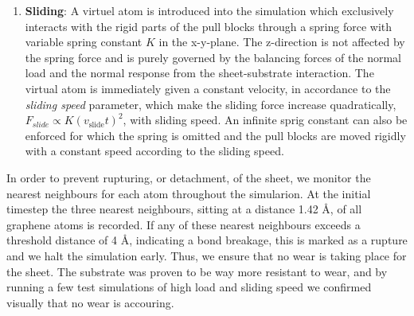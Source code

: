 \begin{enumerate}
  \item \textbf{Sliding}: A virtuel atom is introduced into the simulation which
  exclusively interacts with the rigid parts of the pull blocks through a spring force
  with variable spring constant $K$ in the x-y-plane. The z-direction is not
  affected by the spring force and is purely governed by the balancing forces of the normal load and the normal response from the sheet-substrate interaction. The
  virtual atom is immediately given a constant velocity, in accordance to
  the \textit{sliding speed} parameter, which make the sliding force increase quadratically, $F_{\textit{slide}} \propto K(v_{\text{slide}}t)^2$, with sliding speed. An infinite sprig constant can also be enforced for which the spring is omitted and the pull blocks are moved rigidly with a constant speed according to the sliding speed.
\end{enumerate}
In order to prevent rupturing, or detachment, of the sheet, we monitor the nearest neighbours for each atom throughout the simularion. At the initial timestep the three nearest neighbours, sitting at a distance 1.42 Å, of all graphene atoms is recorded. If any of these nearest neighbours exceeds a threshold distance of 4 Å, indicating a bond breakage, this is marked as a rupture and we halt the simulation early. Thus, we ensure that no wear is taking place for the sheet. The substrate was proven to be way more resistant to wear, and by running a few test simulations of high load and sliding speed we confirmed visually that no wear is accouring.

